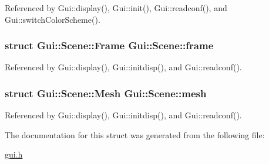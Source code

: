 Referenced by Gui::display(), Gui::init(), Gui::readconf(), and Gui::switchColorScheme().\hypertarget{structGui_1_1Scene_bd3409093955b255885c611f39f5b0af}{
\subsubsection[{frame}]{\setlength{\rightskip}{0pt plus 5cm}struct {\bf Gui::Scene::Frame}	 {\bf Gui::Scene::frame}}}
\label{structGui_1_1Scene_bd3409093955b255885c611f39f5b0af}




Referenced by Gui::display(), Gui::initdisp(), and Gui::readconf().\hypertarget{structGui_1_1Scene_a46c674ee6715e5bc6a86c6943300dab}{
\subsubsection[{mesh}]{\setlength{\rightskip}{0pt plus 5cm}struct {\bf Gui::Scene::Mesh}	 {\bf Gui::Scene::mesh}}}
\label{structGui_1_1Scene_a46c674ee6715e5bc6a86c6943300dab}




Referenced by Gui::display(), Gui::initdisp(), and Gui::readconf().

The documentation for this struct was generated from the following file:\begin{CompactItemize}
\item 
\hyperlink{gui_8h}{gui.h}\end{CompactItemize}
